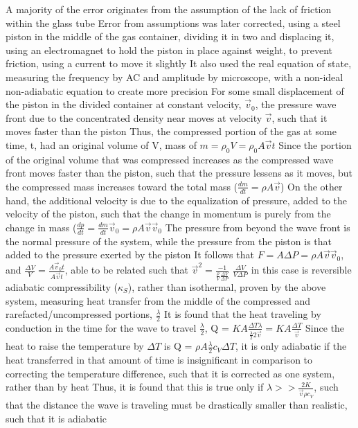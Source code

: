 \begin{outline*}
\2 A majority of the error originates from the assumption of the lack of friction within the glass tube
\3 Error from assumptions was later corrected, using a steel piston in the middle of the gas container, dividing it in two and displacing it, using an electromagnet to hold the piston in place against weight, to prevent friction, using a current to move it slightly
\3 It also used the real equation of state, measuring the frequency by AC and amplitude by microscope, with a non-ideal non-adiabatic equation to create more precision
\2 For some small displacement of the piston in the divided container at constant velocity, $\vec{v}_0$, the pressure wave front due to the concentrated density near moves at velocity $\vec{v}$, such that it moves faster than the piston
\3 Thus, the compressed portion of the gas at some time, t, had an original volume of V, mass of $m = \rho_0 V = \rho_0 A \vec{v} t$
\3 Since the portion of the original volume that was compressed increases as the compressed wave front moves faster than the piston, such that the pressure lessens as it moves, but the compressed mass increases toward the total mass ($\frac{dm}{dt} = \rho A\vec{v}$)
\3 On the other hand, the additional velocity is due to the equalization of pressure, added to the velocity of the piston, such that the change in momentum is purely from the change in mass ($\frac{dp}{dt} = \frac{dm}{dt} \vec{v}_0 = \rho A \vec{v} \vec{v}_0$
\3 The pressure from beyond the wave front is the normal pressure of the system, while the pressure from the piston is that added to the pressure exerted by the piston
\3 It follows that $F = A\Delta P = \rho A \vec{v} \vec{v}_0$, and $\frac{\Delta V}{V} = \frac{A\vec{v}_0 t}{A \vec{v} t}$, able to be related such that $\vec{v}^2 = \frac{-1}{\frac{\rho}{V}\frac{\Delta V}{\Delta P}}$
\4 $\frac{\Delta V}{V \Delta P}$ in this case is reversible adiabatic compressibility ($\kappa_S$), rather than isothermal, proven by the above system, measuring heat transfer from the middle of the compressed and rarefacted/uncompressed portions, $\frac{\lambda}{2}$
\4 It is found that the heat traveling by conduction in the time for the wave to travel $\frac{\lambda}{2}$, Q = $KA\frac{\Delta T \lambda}{\frac{\lambda}{2}2\vec{v}} = KA\frac{\Delta T}{\vec{v}}$
\4 Since the heat to raise the temperature by $\Delta T$ is Q = $\rho A \frac{\lambda}{2}c_V\Delta T$, it is only adiabatic if the heat transferred in that amount of time is insignificant in comparison to correcting the temperature difference, such that it is corrected as one system, rather than by heat
\4 Thus, it is found that this is true only if $\lambda >> \frac{2K}{\vec{v}\rho c_V}$, such that the distance the wave is traveling must be drastically smaller than realistic, such that it is adiabatic

\end{outline*}
